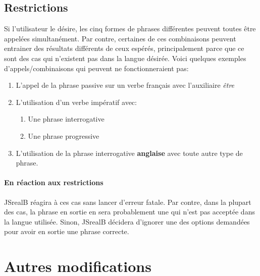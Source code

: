 \documentclass[11pt]{article} %
\newcommand{\system}[1]{\textsf{#1}}
\newcommand{\JSB}{\system{JSrealB}}
\begin{document}
\subsection{Restrictions}
\label{restricType}
Si l'utilisateur le désire, les cinq formes de phrases différentes peuvent toutes être appelées simultanément. Par contre, certaines de ces combinaisons peuvent entrainer des résultats différents de ceux espérés, principalement parce que ce sont des cas qui n'existent pas dans la langue désirée. Voici quelques exemples d'appels/combinaisons qui peuvent ne fonctionneraient pas:
\begin{enumerate}
\item L'appel de la phrase passive sur un verbe français avec l'auxiliaire \emph{être}
\item L'utilisation d'un verbe impératif avec:
\begin{enumerate}
\item Une phrase interrogative
\item Une phrase progressive
\end{enumerate}
\item L'utilisation de la phrase interrogative \textbf{anglaise} avec
toute autre type de phrase.
\end{enumerate}

\paragraph{En réaction aux restrictions}
\JSB{} réagira à ces cas sans lancer d'erreur fatale. Par contre, dans la plupart des cas, la phrase en sortie en sera probablement une qui n'est pas acceptée dans la langue utilisée. Sinon, \JSB{} décidera d'ignorer une des options demandées pour avoir en sortie une phrase correcte.


\section{Autres modifications}
\end{document}
